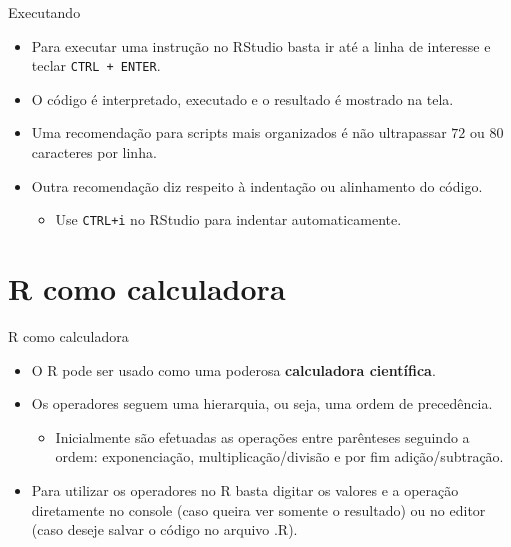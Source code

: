 \documentclass[
  ignorenonframetext,
  serif,
  professionalfont,
  usenames,
  dvipsnames,
  aspectratio = 169]{beamer}
\providecommand{\tightlist}{%
  \setlength{\itemsep}{0pt}\setlength{\parskip}{0pt}}
\renewcommand{\tightlist}{%
  \setlength{\itemsep}{0\baselineskip}
  \setlength{\parskip}{0.25\baselineskip}
}
\begin{document}
\begin{frame}[fragile]{Executando}
\label{executando}
\begin{itemize}
\tightlist
\item
  Para executar uma instrução no RStudio basta ir até a linha de
  interesse e teclar \texttt{CTRL\ +\ ENTER}.
\end{itemize}

\vspace{0.3cm}

\begin{itemize}
\tightlist
\item
  O código é interpretado, executado e o resultado é mostrado na tela.
\end{itemize}

\vspace{0.3cm}

\begin{itemize}
\tightlist
\item
  Uma recomendação para scripts mais organizados é não ultrapassar
  \(72\) ou \(80\) caracteres por linha.
\end{itemize}

\vspace{0.3cm}

\begin{itemize}
\tightlist
\item
  Outra recomendação diz respeito à indentação ou alinhamento do código.

  \begin{itemize}
  \tightlist
  \item
    Use \texttt{CTRL+i} no RStudio para indentar automaticamente.
  \end{itemize}
\end{itemize}
\end{frame}

\section{R como calculadora}\label{r-como-calculadora}

\begin{frame}{R como calculadora}
\label{r-como-calculadora-1}
\begin{itemize}
\item
  O R pode ser usado como uma poderosa \textbf{calculadora científica}.
\item
  Os operadores seguem uma hierarquia, ou seja, uma ordem de
  precedência.

  \begin{itemize}
  \tightlist
  \item
    Inicialmente são efetuadas as operações entre parênteses seguindo a
    ordem: exponenciação, multiplicação/divisão e por fim
    adição/subtração.
  \end{itemize}
\item
  Para utilizar os operadores no R basta digitar os valores e a operação
  diretamente no console (caso queira ver somente o resultado) ou no
  editor (caso deseje salvar o código no arquivo .R).
\end{itemize}
\end{frame}
\end{document}
